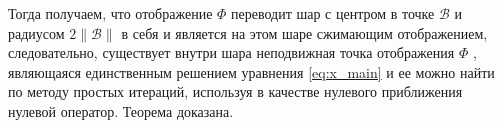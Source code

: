 Тогда получаем, что отображение $\Phi$ переводит шар с центром в точке $\mathcal{B}$ и радиусом $2\|\mathcal{B}\|$ в себя и является на этом шаре сжимающим отображением, следовательно, существует внутри шара неподвижная точка отображения $\Phi$ , являющаяся единственным решением уравнения \eqref{eq:x_main} и ее можно найти по методу простых итераций, используя в качестве нулевого приближения нулевой оператор. Теорема доказана.
\hfill